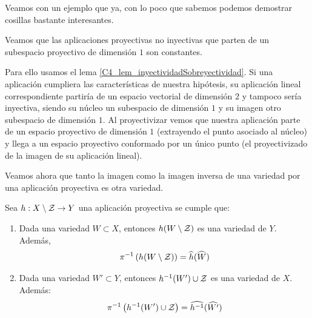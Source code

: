 Veamos con un ejemplo que ya, con lo poco que sabemos podemos demostrar cosillas bastante interesantes.
\begin{exa}
	Veamos que las aplicaciones proyectivas no inyectivas que parten de un subespacio proyectivo de dimensión $1$ son constantes.
	
	Para ello usamos el lema \ref{C4_lem_inyectividadSobreyectividad}. Si una aplicación cumpliera las características de nuestra hipótesis, su aplicación lineal correspondiente partiría de un espacio vectorial de dimensión $2$ y tampoco sería inyectiva, siendo su núcleo un subespacio de dimensión $1$ y su imagen otro subespacio de dimensión $1$. Al proyectivizar vemos que nuestra aplicación parte de un espacio proyectivo de dimensión $1$ (extrayendo el punto asociado al núcleo) y llega a un espacio proyectivo conformado por un único punto (el proyectivizado de la imagen de su aplicación lineal).
\end{exa}
Veamos ahora que tanto la imagen como la imagen inversa de una variedad por una aplicación proyectiva es otra variedad.
\begin{lem}
	\label{C4_lem_preservaVariedades}
	Sea $h:X\setminus\mathcal{Z}\rightarrow Y$ una aplicación proyectiva se cumple que:
	\begin{enumerate}
		\item Dada una variedad $W\subset X$, entonces $h(W\setminus\mathcal{Z})$ es una variedad de $Y$. Además, \[\pi^{-1}\left(h(W\setminus \mathcal{Z})\right)=\widehat{h}(\widehat{W})\]
		\item Dada una variedad $W'\subset Y$, entonces $h^{-1}(W')\cup\mathcal{Z}$ es una variedad de $X$. Además: \[\pi^{-1}\left(h^{-1}(W')\cup\mathcal{Z}\right)=\widehat{h^{-1}}(\widehat{W'})\]
	\end{enumerate}
\end{lem}
